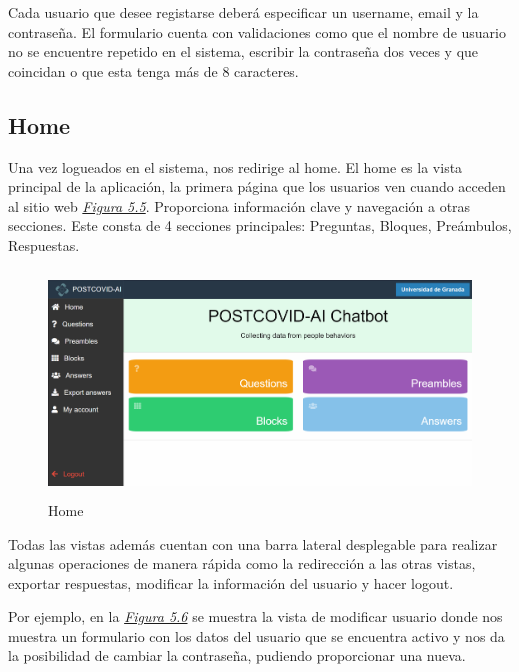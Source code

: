 Cada usuario que desee registarse deberá especificar un username, email y la contraseña. El formulario cuenta con validaciones como que el nombre de usuario no se encuentre repetido en el sistema, escribir la contraseña dos veces y que coincidan o que esta tenga más de 8 caracteres. 

\subsection{Home}

Una vez logueados en el sistema, nos redirige al home. El home es la vista principal de la aplicación, la primera página que los usuarios ven cuando acceden al sitio web \textit{\hyperref[fig:home]{Figura 5.5}}. Proporciona información clave y navegación a otras secciones. Este consta de 4 secciones principales: Preguntas, Bloques, Preámbulos, Respuestas.\vspace{0.5cm}

\begin{figure}[!ht]
    \centering
    \includegraphics[width=1\textwidth, height=6cm]{imagenes/home2.png}
    \caption{ Home }
    \label{fig:home}
\end{figure}
\vspace{0.5cm}

Todas las vistas además cuentan con una barra lateral desplegable para realizar algunas operaciones de manera rápida como la redirección a las otras vistas, exportar respuestas, modificar la información del usuario y hacer logout. 

Por ejemplo, en la \textit{\hyperref[fig:modify-user]{Figura 5.6}} se muestra la vista de modificar usuario donde nos muestra un formulario con los datos del usuario que se encuentra activo y nos da la posibilidad de cambiar la contraseña, pudiendo proporcionar una nueva.\vspace{0.5cm} 

